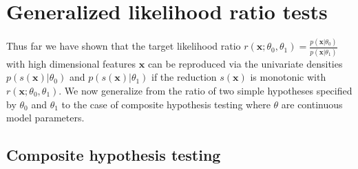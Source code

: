 \documentclass[12pt]{article}
\numberwithin{equation}{section}
\theoremstyle{plain}
\begin{document}


\section{Generalized likelihood ratio tests}
\label{sec:generalized-likelihood-ratio}

Thus far we have shown that the target likelihood ratio
$r(\mathbf{x};\theta_0,\theta_1)=\frac{p(\mathbf{x}|\theta_0)}{p(\mathbf{x}|\theta_1)}$
with high dimensional features $\mathbf{x}$ can be reproduced via the univariate
densities $p(s(\mathbf{x})|\theta_0)$ and $p(s(\mathbf{x})|\theta_1)$ if the
reduction $s(\mathbf{x})$ is monotonic with $r(\mathbf{x};\theta_0,\theta_1)$.
We now generalize from the ratio of two simple hypotheses specified by
$\theta_0$ and $\theta_1$ to the case of composite hypothesis testing where
$\theta$ are continuous model parameters.

\subsection{Composite hypothesis testing}
\label{sec:composite-hypothesis-testing}



%
%
%
%
\end{document}
